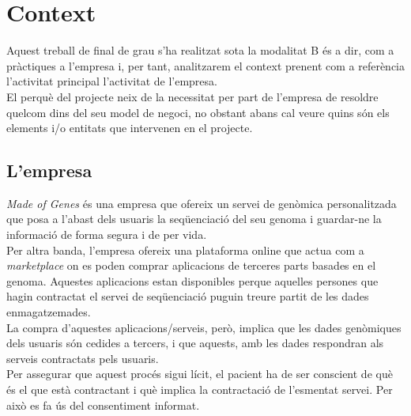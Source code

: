 \section{Context}
\label{context}
Aquest treball de final de grau s'ha realitzat sota la modalitat B és a dir, com a pràctiques a l'empresa i, per tant, analitzarem el context prenent com a referència l'activitat principal l'activitat de l'empresa.\\
\newline El perquè del projecte neix de la necessitat per part de l'empresa de resoldre quelcom dins del seu model de negoci, no obstant abans cal veure quins són els elements i/o entitats que intervenen en el projecte.

\subsection{L'empresa}
\textit{Made of Genes} és una empresa que ofereix un servei de genòmica personalitzada que posa a l'abast dels usuaris la seqüenciació del seu genoma i guardar-ne la informació de forma segura i de per vida.\\
\newline Per altra banda, l'empresa ofereix una plataforma online que actua com a \textit{marketplace} on es poden comprar aplicacions de terceres parts basades en el genoma.
Aquestes aplicacions estan disponibles perque aquelles persones que hagin contractat el servei de seqüenciació puguin treure partit de les dades enmagatzemades.\\
\newline La compra d'aquestes aplicacions/serveis, però, implica que les dades genòmiques dels usuaris són cedides a  tercers, i que aquests, amb les dades respondran als serveis contractats pels usuaris.\\
\newline Per assegurar que aquest procés sigui lícit, el pacient ha de ser conscient de què és el que està contractant i què implica la contractació de l'esmentat servei. Per això es fa ús del consentiment informat.

